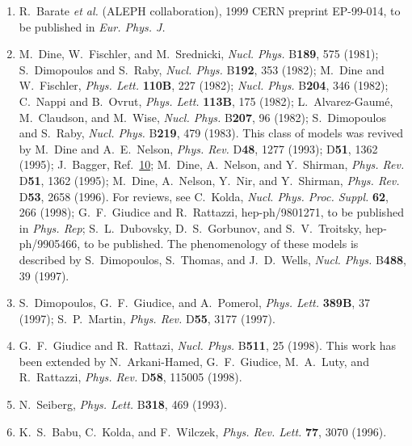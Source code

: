 \begin{enumerate}
  \item[29a.] \label{ch28-ref-29a}
  R.~Barate \textit{et al.} (ALEPH collaboration), 1999 CERN preprint
  EP-99-014, to be published in \textit{Eur. Phys. J.}

  \item {}\label{ch28-ref-30}
  M.~Dine, W.~Fischler, and M.~Srednicki, \textit{Nucl. Phys.}
  B\textbf{189}, 575 (1981); S.~Dimopoulos and S.~Raby,
  \textit{Nucl. Phys.} B\textbf{192}, 353 (1982); M.~Dine and
  W.~Fischler, \textit{Phys. Lett.} \textbf{110B}, 227 (1982);
  \textit{Nucl. Phys.} B\textbf{204}, 346 (1982); C.~Nappi and
  B.~Ovrut, \textit{Phys. Lett.} \textbf{113B}, 175 (1982);
  L.~Alvarez-Gaum\'e, M.~Claudson, and M.~Wise, \textit{Nucl. Phys.}
  B\textbf{207}, 96 (1982); S.~Dimopoulos and S.~Raby,
  \textit{Nucl. Phys.} B\textbf{219}, 479 (1983). This class of models
  was revived by M.~Dine and A.~E.~Nelson, \textit{Phys. Rev.}
  D\textbf{48}, 1277 (1993); D\textbf{51}, 1362 (1995); J.~Bagger,
  Ref.~\hyperref[ch28-ref-10]{10}; M.~Dine, A.~Nelson, and Y.~Shirman,
  \textit{Phys. Rev.} D\textbf{51}, 1362 (1995); M.~Dine, A.~Nelson,
  Y.~Nir, and Y.~Shirman, \textit{Phys. Rev.} D\textbf{53}, 2658
  (1996). For reviews, see C.~Kolda, \textit{Nucl. Phys. Proc. Suppl.}
  \textbf{62}, 266 (1998); G.~F.~Giudice and R.~Rattazzi,
  hep-ph/9801271, to be published in \textit{Phys. Rep}; S.~L.~Dubovsky,
  D.~S.~Gorbunov, and S.~V.~Troitsky, hep-ph/9905466, to be published.
  The phenomenology of these models is described by S.~Dimopoulos,
  S.~Thomas, and J.~D.~Wells, \textit{Nucl. Phys.} B\textbf{488}, 39
  (1997).

  \item {}\label{ch28-ref-31}
  S.~Dimopoulos, G.~F.~Giudice, and A.~Pomerol, \textit{Phys. Lett.}
  \textbf{389B}, 37 (1997); S.~P.~Martin, \textit{Phys. Rev.}
  D\textbf{55}, 3177 (1997).

  \item {}\label{ch28-ref-32}
  G.~F.~Giudice and R.~Rattazi, \textit{Nucl. Phys.} B\textbf{511}, 25
  (1998). This work has been extended by N.~Arkani-Hamed,
  G.~F.~Giudice, M.~A.~Luty, and R.~Rattazzi, \textit{Phys. Rev.}
  D\textbf{58}, 115005 (1998).

  \item {}\label{ch28-ref-33}
  N.~Seiberg, \textit{Phys. Lett.} B\textbf{318}, 469 (1993).

  \item {}\label{ch28-ref-34}
  K.~S.~Babu, C.~Kolda, and F.~Wilczek, \textit{Phys. Rev. Lett.}
  \textbf{77}, 3070 (1996).


\end{enumerate}
